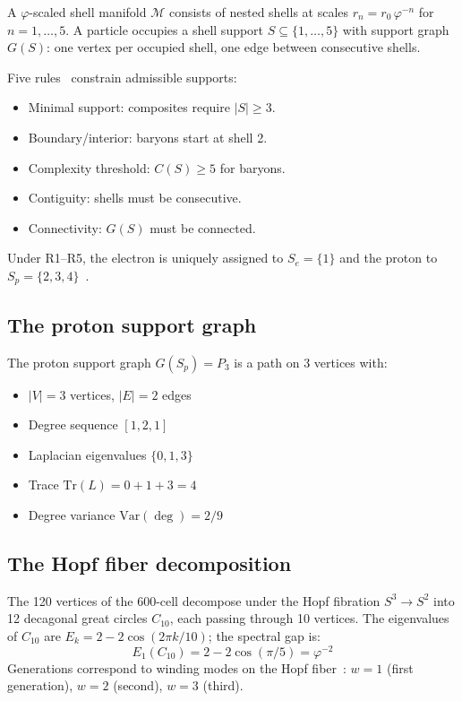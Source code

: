 \documentclass[12pt]{article}
\newcommand{\phig}{\varphi}
\begin{document}
A $\phig$-scaled shell manifold $\mathcal{M}$ consists of nested shells at scales $r_n = r_0\,\phig^{-n}$ for $n = 1, \ldots, 5$. A particle occupies a shell support $S \subseteq \{1, \ldots, 5\}$ with support graph $G(S)$: one vertex per occupied shell, one edge between consecutive shells.

Five rules~\citep{SmartIV} constrain admissible supports:
\begin{itemize}
    \item[\textbf{R1}] Minimal support: composites require $|S| \geq 3$.
    \item[\textbf{R2}] Boundary/interior: baryons start at shell 2.
    \item[\textbf{R3}] Complexity threshold: $C(S) \geq 5$ for baryons.
    \item[\textbf{R4}] Contiguity: shells must be consecutive.
    \item[\textbf{R5}] Connectivity: $G(S)$ must be connected.
\end{itemize}
Under R1--R5, the electron is uniquely assigned to $S_e = \{1\}$ and the proton to $S_p = \{2,3,4\}$~\citep{SmartIV}.

\subsection{The proton support graph}

The proton support graph $G(S_p) = P_3$ is a path on 3 vertices with:
\begin{itemize}
    \item $|V| = 3$ vertices, $|E| = 2$ edges
    \item Degree sequence $[1, 2, 1]$
    \item Laplacian eigenvalues $\{0, 1, 3\}$
    \item Trace $\mathrm{Tr}(L) = 0 + 1 + 3 = 4$
    \item Degree variance $\mathrm{Var}(\deg) = 2/9$
\end{itemize}

\subsection{The Hopf fiber decomposition}

The 120 vertices of the 600-cell decompose under the Hopf fibration $S^3 \to S^2$ into 12 decagonal great circles $C_{10}$, each passing through 10 vertices. The eigenvalues of $C_{10}$ are $E_k = 2 - 2\cos(2\pi k/10)$; the spectral gap is:
\begin{equation}\label{eq:fiber_gap}
    E_1(C_{10}) = 2 - 2\cos(\pi/5) = \phig^{-2}
\end{equation}
Generations correspond to winding modes on the Hopf fiber~\citep{SmartXXII}: $w = 1$ (first generation), $w = 2$ (second), $w = 3$ (third).
\end{document}
